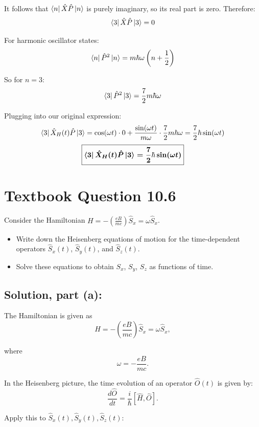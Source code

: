 \documentclass[12pt]{article}
\begin{document}
        It follows that \(\bra{n} \hat{X} \hat{P} \ket{n}\) is purely imaginary, so its real part is zero. Therefore:
        \[
            \bra{3} \hat{X} \hat{P} \ket{3} = 0 
        \]
        
        For harmonic oscillator states:
        \[
            \bra{n} \hat{P}^2 \ket{n} = m \hbar \omega \left(n + \frac{1}{2} \right)
        \]
        
        So for \(n = 3\):
        \[
            \bra{3} \hat{P}^2 \ket{3} = \frac{7}{2} m \hbar \omega 
        \]
        
        Plugging into our original expression:
        \[
            \bra{3} \hat{X}_H(t) \hat{P} \ket{3} = \cos(\omega t) \cdot 0 + \frac{\sin(\omega t)}{m\omega} \cdot \frac{7}{2} m \hbar \omega
            = \frac{7}{2} \hbar \sin(\omega t) 
        \]
        \[
            \boldsymbol{\boxed{\bra{3} \hat{X}_H(t) \hat{P} \ket{3} = \frac{7}{2} \hbar \sin(\omega t)}}
        \]

\section{Textbook Question 10.6}
    Consider the Hamiltonian \( H = -\left( \frac{eB}{mc} \right) \hat{S}_x = \omega \hat{S}_x \).
    \begin{itemize}
        \item[(a)] Write down the Heisenberg equations of motion for the time-dependent operators \( \hat{S}_x(t) \), \( \hat{S}_y(t) \), and \( \hat{S}_z(t) \).
        \item[(b)] Solve these equations to obtain \( S_x \), \( S_y \), \( S_z \) as functions of time.
    \end{itemize}

    \subsection{Solution, part (a):}
        The Hamiltonian is given as
        \[
            \hat{H} = -\left(\frac{eB}{mc}\right) \hat{S}_x = \omega \hat{S}_x,
        \]
        
        where
        \[
            \omega = -\frac{eB}{mc}.
        \]
        
        In the Heisenberg picture, the time evolution of an operator \( \hat{O}(t) \) is given by:
        \[
            \frac{d\hat{O}}{dt} = \frac{i}{\hbar} [\hat{H}, \hat{O}].
        \]
        
        Apply this to \( \hat{S}_x(t), \hat{S}_y(t), \hat{S}_z(t) \):
        
\end{document}
